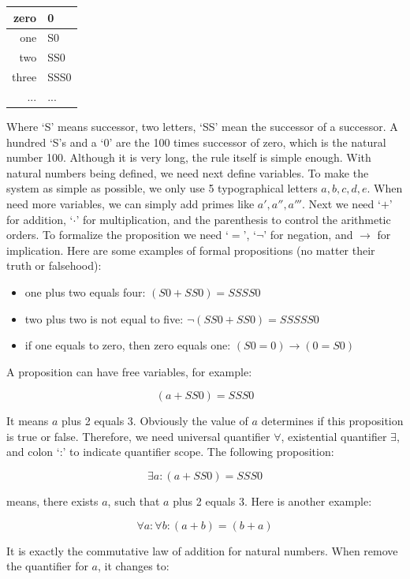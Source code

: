 \documentclass{article}
\begin{document}
\vspace{5mm}
\begin{tabular}{|r|l|}
zero & 0 \\
\hline
one & S0 \\
\hline
two & SS0 \\
\hline
three & SSS0 \\
\hline
... & ... \\
\end{tabular}
\vspace{5mm}

Where `S' means successor, two letters, `SS' mean the successor of a successor. A hundred `S's and a `0' are the 100 times successor of zero, which is the natural number 100. Although it is very long, the rule itself is simple enough. With natural numbers being defined, we need next define variables. To make the system as simple as possible, we only use 5 typographical letters $a, b, c, d, e$. When need more variables, we can simply add primes like $a', a'', a'''$. Next we need `$+$' for addition, `$\cdot$' for multiplication, and the parenthesis to control the arithmetic orders. To formalize the proposition we need `$=$', `$\lnot$' for negation, and $\to$ for implication. Here are some examples of formal propositions (no matter their truth or falsehood):

\begin{itemize}
\item one plus two equals four: $(S0 + SS0) = SSSS0$
\item two plus two is not equal to five: $\lnot (SS0 + SS0) = SSSSS0$
\item if one equals to zero, then zero equals one: $(S0 = 0) \to (0 = S0)$
\end{itemize}

A proposition can have free variables, for example:

\[
(a + SS0) = SSS0
\]

It means $a$ plus 2 equals 3. Obviously the value of $a$ determines if this proposition is true or false. Therefore, we need universal quantifier $\forall$, existential quantifier $\exists$, and colon `:' to indicate quantifier scope. The following proposition:

\[
\exists a : (a + SS0) = SSS0
\]

means, there exists $a$, such that $a$ plus 2 equals 3. Here is another example:

\[
\forall a : \forall b : (a + b) = (b + a)
\]

It is exactly the commutative law of addition for natural numbers. When remove the quantifier for $a$, it changes to:
\end{document}

